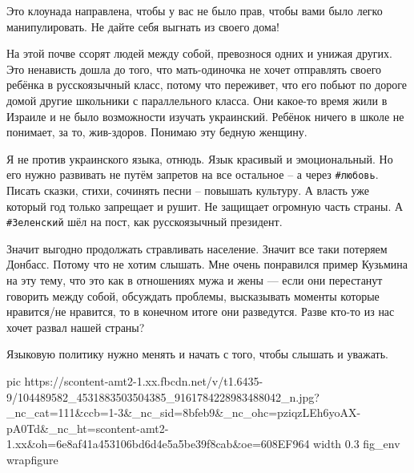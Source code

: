 Это клоунада направлена, чтобы у вас не было прав, чтобы вами было легко
манипулировать. Не дайте себя выгнать из своего дома!

На этой почве ссорят людей между собой, превознося одних и унижая других. Это
ненависть дошла до того, что мать-одиночка не хочет отправлять своего ребёнка в
русскоязычный класс, потому что переживет, что его побьют по дороге домой
другие школьники с параллельного класса. Они какое-то время жили в Израиле и не
было возможности изучать украинский. Ребёнок ничего в школе не понимает, за то,
жив-здоров. Понимаю эту бедную женщину.

Я не против украинского языка, отнюдь. Язык красивый и эмоциональный. Но его
нужно развивать не путём запретов на все остальное – а через \verb|#любовь|. Писать
сказки, стихи, сочинять песни – повышать культуру. А власть уже который год
только запрещает и рушит. Не защищает огромную часть страны. А \verb|#Зеленский| шёл
на пост, как русскоязычный президент.

Значит выгодно продолжать стравливать население. Значит все таки потеряем
Донбасс. Потому что не хотим слышать. Мне очень понравился пример Кузьмина на
эту тему, что это как в отношениях мужа и жены — если они перестанут говорить
между собой, обсуждать проблемы, высказывать моменты которые нравится/не
нравится, то в конечном итоге они разведутся. Разве кто-то из нас хочет развал
нашей страны?

Языковую политику нужно менять и начать с того, чтобы слышать и уважать.

\ifcmt
  pic https://scontent-amt2-1.xx.fbcdn.net/v/t1.6435-9/104489582_4531883503504385_9161784228983488042_n.jpg?_nc_cat=111&ccb=1-3&_nc_sid=8bfeb9&_nc_ohc=pziqzLEh6yoAX-pA0Td&_nc_ht=scontent-amt2-1.xx&oh=6e8af41a453106bd6d4e5a5be39f8cab&oe=608EF964
  width 0.3
	fig_env wrapfigure
\fi


